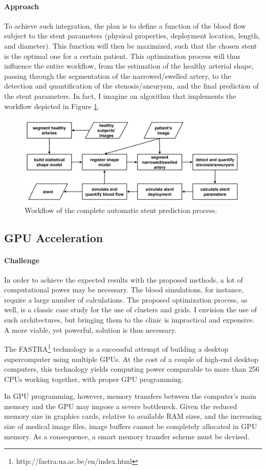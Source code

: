 \documentclass[a4paper]{article}
\newcommand{\challenge}{\paragraph{Challenge}}
\newcommand{\approach}{\paragraph{Approach}}
\begin{document}
\approach
To achieve such integration, the plan is to define a function of the blood flow subject to the stent parameters (physical properties, deployment location, length, and diameter). This function will then be maximized, such that the chosen stent is the optimal one for a certain patient. This optimization process will thus influence the entire workflow, from the estimation of the healthy arterial shape, passing through the segmentation of the narrowed/swelled artery, to the detection and quantification of the stenosis/aneurysm, and the final prediction of the stent parameters. In fact, I imagine an algorithm that implements the workflow depicted in Figure \ref{fig:workflow}. 


\begin{figure}%
\centering
\includegraphics[width=0.8\columnwidth]{workflow.png}%
\caption{Workflow of the complete automatic stent prediction process.}%
\label{fig:workflow}%
\end{figure}

\subsection{GPU Acceleration}

\challenge
In order to achieve the expected results with the proposed methods, a lot of computational power may be necessary. The blood simulations, for instance, require a large number of calculations. The proposed optimization process, as well, is a classic case study for the use of clusters and grids. I envision the use of such architectures, but bringing them to the clinic is impractical and expensive. A more viable, yet powerful, solution is thus necessary.

The FASTRA\footnote{http://fastra.ua.ac.be/en/index.html} technology is a successful attempt of building a desktop supercomputer using multiple GPUs. At the cost of a couple of high-end desktop computers, this technology yields computing power comparable to more than 256 CPUs working together, with proper GPU programming.

In GPU programming, however, memory transfers between the computer's main memory and the GPU may impose a severe bottleneck. Given the reduced memory size in graphics cards, relative to available RAM sizes, and the increasing size of medical image files, image buffers cannot be completely allocated in GPU memory. As a consequence, a smart memory transfer scheme must be devised. 
\end{document}

